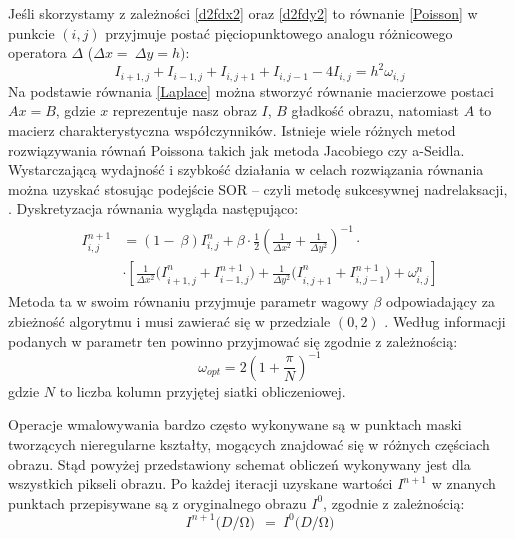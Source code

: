 \documentclass[12pt, twoside, openany]{report}
\theoremstyle{definition}
\begin{document}
Jeśli skorzystamy z zależności \eqref{d2fdx2} oraz \eqref{d2fdy2} to równanie \eqref{Poisson} w punkcie $(i,j)$ przyjmuje postać pięciopunktowego analogu różnicowego operatora $\Delta $ ($\Delta x=\ \Delta y=h)$:
\begin{equation}
I_{i+1,j}+I_{i-1,j}+I_{i,j+1}+I_{i,j-1}-4I_{i,j}=h^2{\omega }_{i,j}
\label{Laplace}
\end{equation}
Na podstawie równania \eqref{Laplace} można stworzyć równanie macierzowe postaci $Ax=B$, gdzie $x$ reprezentuje nasz obraz $I$, $B$ gładkość obrazu, natomiast $A$ to macierz charakterystyczna współczynników. Istnieje wiele różnych metod rozwiązywania równań Poissona takich jak metoda Jacobiego czy 
a-Seidla.  Wystarczającą wydajność i szybkość działania w celach rozwiązania równania można uzyskać stosując podejście SOR – czyli metodę sukcesywnej nadrelaksacji, \cite{blacksuccessive}. Dyskretyzacja równania wygląda następująco:
\begin{align}
\begin{aligned}
I^{n+1}_{i,j}
&= \left(1-\ \beta \right)I^n_{i,j}+\beta \cdot \frac{1}{2}{\left(\frac{1}{\Delta x^2}+\frac{1}{\Delta y^2}\right)}^{-1} \cdot \\[1ex]
&\cdot \left[\frac{1}{\Delta x^2}{(I}^n_{i+1,j}+I^{n+1}_{i-1,j})+\frac{1}{\Delta y^2}{(I}^n_{i,j+1}+I^{n+1}_{i,j-1})+{\omega }^n_{i,j}\right]
\end{aligned}
\label{DiscreteSOR}
\end{align}
Metoda ta w swoim równaniu przyjmuje parametr wagowy $\beta$ odpowiadający za zbieżność algorytmu i musi zawierać się w przedziale $(0,2)$ \cite{neumann1981kahan}. Według informacji podanych w  \cite{blacksuccessive} parametr ten powinno przyjmować się zgodnie z zależnością:
\begin{equation}
{\omega }_{opt}=2{\left(1+\frac{\pi }{N}\right)}^{-1}
\label{BetaChoose}
\end{equation}
gdzie $N$ to liczba kolumn przyjętej siatki obliczeniowej. 
\par
Operacje wmalowywania bardzo często wykonywane są w punktach maski tworzących nieregularne kształty, mogących znajdować się w różnych częściach obrazu. Stąd powyżej przedstawiony schemat obliczeń wykonywany jest dla wszystkich pikseli obrazu. Po każdej iteracji uzyskane wartości $I^{n+1}$ w znanych punktach przepisywane są z oryginalnego obrazu $I^{0}$, zgodnie z zależnością:
\begin{equation}
I^{n+1}(D/\mathrm{\Omega }\mathrm{)\ }\ ={\ I}^0(D/\mathrm{\Omega }\mathrm{)}
\label{retrieveMask}
\end{equation}
\end{document}
